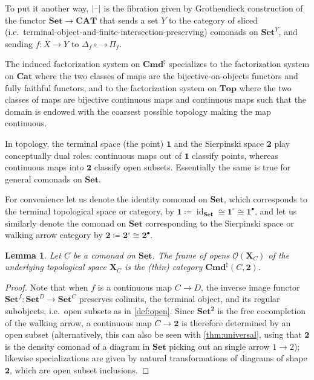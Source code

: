 \documentclass[11pt, oneside, article]{memoir}
\theoremstyle{plain}
\newtheorem{lemma}[theorem]{Lemma}
\theoremstyle{definition}
\theoremstyle{remark}
\newenvironment{remark}
{\renewcommand\qedsymbol{$\lrcorner$}%
  \pushQED{\qed}\myremark}
{\popQED\endmyremark}
\DeclareMathOperator{\id}{id}
\DeclarePairedDelimiter{\abs}{\lvert}{\rvert}
\newcommand{\dash}{{\mathord{\text{--}}}}
\newcommand{\bang}{\mathrm{!}}
\newcommand{\namedcat}[1]{\mathbf{#1}}
\newcommand{\spa}[1]{\mathbf{#1}}
\newcommand{\Set}{\namedcat{Set}}
\newcommand{\Cat}{\namedcat{Cat}}
\newcommand{\CAT}{\namedcat{CAT}}
\renewcommand{\Top}{\namedcat{Top}}
\newcommand{\Con}{\namedcat{Cmd}^\natural}
\newcommand{\ConSet}{\Con}
\newcommand{\ConO}{\Con}
\newcommand{\ConOSet}{\ConO}
\newcommand{\CoalgOn}[2]{{#2}^{#1}}
\newcommand{\CoalgSet}[1]{\CoalgOn{#1}{\Set}}
\newcommand{\clift}[1]{\overline{#1}}
\newcommand{\pts}[1]{{\abs{#1}}}
\newcommand{\one}[1]{\pts{#1}}
\newcommand{\reindex}[1]{\Delta_{#1}}
\newcommand{\point}{\mathbf{1}}
\newcommand{\arro}{\mathbf{2}}
\newcommand{\sier}{\arro}
\newcommand{\slicel}{\Sigma_\bang}
\newcommand{\slicer}{\Delta_\bang}
\newcommand{\con}[2]{{#1}^{#2}}
\newcommand{\Ho}[1]{#1}
\newcommand{\cmnd}[1]{{#1}}
\newcommand{\xX}{X}
\newcommand{\xY}{Y}
\newcommand{\cC}{\cmnd{C}}
\newcommand{\cD}{\cmnd{D}}
\newcommand{\tX}{\spa{X}}
\newcommand{\CSet}{\CoalgSet{\cC}}
\newcommand{\DSet}{\CoalgSet{\cD}}
\newcommand{\idSet}{\id_\Set}
\newcommand{\cattocmd}[1]{{{#1}^\bullet}}
\newcommand{\toptocmd}[1]{{{#1}^\circ}}
\newcommand{\cmdtotop}[1]{{\tX_{#1}}}
\newcommand{\pointcmd}{\point}
\newcommand{\arrocmd}{\arro}
\newcommand{\opens}[1]{\mathcal{O}(#1)}
\begin{document}
To put it another way, $\one{\dash}$ is the fibration given by
Grothendieck construction of the functor $\Set \to \CAT$ that sends a
set $\xY$ to the category of sliced (i.e.\
terminal-object-and-finite-intersection-preserving) comonads on
$\Set^\xY$, and sending $f \colon \xX \to \xY$ to
$\reindex{f} \circ \dash \circ \Pi_{f}$.


\begin{remark}\label{rem:booff}
  The induced factorization system on $\ConOSet$ specializes to the
  factorization system on $\Cat$ where the two classes of maps are the
  bijective-on-objects functors and fully faithful functors, and to the
  factorization system on $\Top$ where the two classes of maps are
  bijective continuous maps and continuous maps such that the domain is
  endowed with the coarsest possible topology making the map
  continuous.
\end{remark}

In topology, the terminal space (the point) $\point$ and the
Sierpinski space $\sier$ play conceptually dual roles: continuous maps
out of $\point$ classify points, whereas continuous maps into $\sier$
classify open subsets. Essentially the same is true for general comonads on
$\Set$.

For convenience let us denote the identity comonad on $\Set$, which
corresponds to the terminal topological space or category, by
$\pointcmd \coloneqq \idSet \cong \toptocmd{\point} \cong
\cattocmd{\point}$, and let us similarly denote the comonad on $\Set$
corresponding to the Sierpinski space or walking arrow category by
$\arrocmd \coloneqq \toptocmd{\sier} \cong \cattocmd{\arro}$.

\begin{lemma}
  Let $\cC$ be a comonad on $\Set$. The frame of opens
  $\opens{\cmdtotop{\cC}}$ of the underlying topological space
  $\cmdtotop{\cC}$ is the (thin) category
  $\Ho{\ConSet}(\cC, \arrocmd)$.
\end{lemma}
\begin{proof}
  Note that when $f$ is a continuous map $\cC \to \cD$, the inverse
  image functor $\con{\Set}{f} \colon \DSet \to \CSet$ preserves
  colimits, the terminal object, and its regular subobjects, i.e.\
  open subsets as in \cref{def:open}. Since $\CoalgSet{\arrocmd}$ is
  the free cocompletion of the walking arrow, a continuous map
  $\cC \to \arrocmd$ is therefore determined by an open subset
  (alternatively, this can also be seen with \cref{thm:universal},
  using that $\sier$ is the density comonad of a diagram in $\Set$
  picking out an single arrow $1 \to 2$); likewise specializations are
  given by natural transformations of diagrams of shape $\arro$, which
  are open subset inclusions.
\end{proof}
\end{document}
